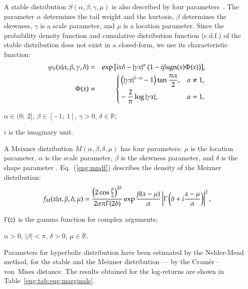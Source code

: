 A stable distribution $S(\alpha, \beta, \gamma, \mu)$ is also described by four parameters~\cite{Rachev2005, Nolan2009, Stoyanov2013}.
The parameter $\alpha$ determines the tail weight and the kurtosis, $\beta$ determines the skewness, $\gamma$ is a scale parameter, and $\mu$ is a location parameter.
Since the probability density function and cumulative distribution function (c.d.f.) of the stable distribution does not exist in a closed-form, we use its characteristic function:
\begin{eqnarray}\label{eng:StChF} 
\varphi_S(x|\alpha,\beta,\gamma,\delta) &=& \exp{\left[ix\delta-|\gamma x|^\alpha \left(1 - i\beta\text{sgn}(x)\Upphi(x)\right)\right]}, \\
\Upphi(x) &=& \left\{ \begin{aligned}
    & \left(|\gamma x|^{1-\alpha} - 1\right)\tan{\frac{\pi\alpha}{2}}, & & \alpha \ne 1, \\
    & -\frac{2}{\pi}\log{|\gamma x|}, & & \alpha = 1,
\end{aligned} \right. \nonumber
\end{eqnarray}
\begin{where*}
    \item $\alpha \in (0;\ 2]$, $\beta \in [-1;\ 1]$, $\gamma > 0$, $\delta \in \mathbb{R}$;
    \item $i$ is the imaginary unit.
\end{where*}

A Meixner distribution $M(\alpha, \beta, \delta, \mu)$ has four parameters: $\mu$ is the location parameter, $\alpha$ is the scale parameter, $\beta$ is the skewness parameter, and $\delta$ is the shape parameter \cite{Schoutens2002}.
Eq.~(\ref{eng:mpdf}) describes the density of the Meixner distribution:%
\begin{equation} \label{eng:mpdf}
    f_M(x|\alpha,\beta,\delta,\mu)=\frac{\left(2\cos{\frac{\beta}{2}}\right)^{2\delta}}{2\alpha\pi\Upgamma(2\delta)}\exp{\frac{\beta(x-\mu)}{\alpha}}\left|\Upgamma\left(\delta + i\frac{x-\mu}{\alpha}\right)\right|^2,
\end{equation}
\begin{where*}
    \item $\Upgamma(z)$ is the gamma function for complex arguments;
    \item $\alpha > 0$, $|\beta| < \pi$, $\delta > 0$, $\mu \in \mathbb{R}$.
\end{where*}

Parameters for hyperbolic distribution have been estimated by the Nelder-Mead method, for the stable and the Meixner distribution –– by the Cramér\,--\,von~Mises distance. 
The results obtained for the log-returns are shown in Table~\ref{eng:tab:eng:marginals}.

